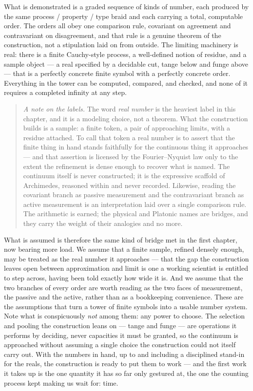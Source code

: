 What is demonstrated is a graded sequence of kinds of number, each produced by the same process /
property / type braid and each carrying a total, computable order. The orders all obey one comparison
rule, covariant on agreement and contravariant on disagreement, and that rule is a genuine theorem of
the construction, not a stipulation laid on from outside. The limiting machinery is real: there is a
finite Cauchy-style process, a well-defined notion of residue, and a sample object --- a real specified by a decidable cut,
tange below and funge above --- that is a perfectly concrete finite symbol with a perfectly concrete
order. Everything in the tower can be computed,
compared, and checked, and none of it requires a completed infinity at any step.

\begin{quote}
\emph{A note on the labels.} The word \emph{real number} is the heaviest label in this chapter, and it
is a modeling choice, not a theorem. What the construction builds is a sample: a finite token, a pair
of approaching limits, with a residue attached. To call that token a real number is to assert that the
finite thing in hand stands faithfully for the continuous thing it approaches --- and that assertion
is licensed by the Fourier--Nyquist law only to the extent the refinement is dense enough to recover
what is named. The continuum itself is never constructed; it is the expressive scaffold of
Archimedes, reasoned within and never recorded. Likewise, reading the covariant branch as passive
measurement and the contravariant branch as active measurement is an interpretation laid over a single
comparison rule. The arithmetic is earned; the physical and Platonic names are bridges, and they carry
the weight of their analogies and no more.
\end{quote}

What is assumed is therefore the same kind of bridge met in the first chapter, now bearing more load.
We assume that a finite sample, refined densely enough, may be treated as the real number it
approaches --- that the gap the construction leaves open between approximation and limit is one a
working scientist is entitled to step across, having been told exactly how wide it is. And we assume
that the two branches of every order are worth reading as the two faces of measurement, the passive and
the active, rather than as a bookkeeping convenience. These are the assumptions that turn a tower of
finite symbols into a usable number system. Note what is conspicuously \emph{not} among them: any
power to choose. The selection and pooling the construction leans on --- tange and funge --- are
operations it performs by deciding, never capacities it must be granted, so the continuum is approached
without assuming a single choice the construction could not itself carry out. With the numbers in hand, up to and including a disciplined
stand-in for the reals, the construction is ready to put them to work --- and the first work it takes
up is the one quantity it has so far only gestured at, the one the counting process kept making us wait
for: time.
